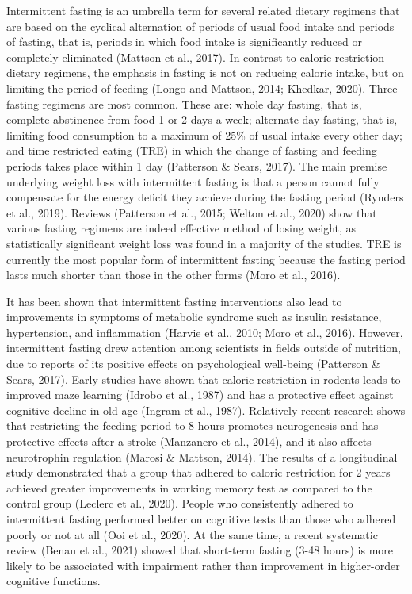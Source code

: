 \documentclass[authordate, empirical]{jote-new-article}
\begin{document}
Intermittent fasting is an umbrella term for several related dietary regimens that are based on the cyclical alternation of periods of usual food intake and periods of fasting, that is, periods in which food intake is significantly reduced or completely eliminated (Mattson et al., 2017). In contrast to caloric restriction dietary regimens, the emphasis in fasting is not on reducing caloric intake, but on limiting the period of feeding (Longo and Mattson, 2014; Khedkar, 2020). Three fasting regimens are most common. These are: whole day fasting, that is, complete abstinence from food 1 or 2 days a week; alternate day fasting, that is, limiting food consumption to a maximum of 25\% of usual intake every other day; and time restricted eating (TRE) in which the change of fasting and feeding periods takes place within 1 day (Patterson \& Sears, 2017). The main premise underlying weight loss with intermittent fasting is that a person cannot fully compensate for the energy deficit they achieve during the fasting period (Rynders et al., 2019). Reviews (Patterson et al., 2015; Welton et al., 2020) show that various fasting regimens are indeed effective method of losing weight, as statistically significant weight loss was found in a majority of the studies. TRE is currently the most popular form of intermittent fasting because the fasting period lasts much shorter than those in the other forms (Moro et al., 2016).



It has been shown that intermittent fasting interventions also lead to improvements in symptoms of metabolic syndrome such as insulin resistance, hypertension, and inflammation (Harvie et al., 2010; Moro et al., 2016). However, intermittent fasting drew attention among scientists in fields outside of nutrition, due to reports of its positive effects on psychological well-being (Patterson \& Sears, 2017). Early studies have shown that caloric restriction in rodents leads to improved maze learning (Idrobo et al., 1987) and has a protective effect against cognitive decline in old age (Ingram et al., 1987). Relatively recent research shows that restricting the feeding period to 8 hours promotes neurogenesis and has protective effects after a stroke (Manzanero et al., 2014), and it also affects neurotrophin regulation (Marosi \& Mattson, 2014). The results of a longitudinal study demonstrated that a group that adhered to caloric restriction for 2 years achieved greater improvements in working memory test as compared to the control group (Leclerc et al., 2020). People who consistently adhered to intermittent fasting performed better on cognitive tests than those who adhered poorly or not at all (Ooi et al., 2020). At the same time, a recent systematic review (Benau et al., 2021) showed that short-term fasting (3-48 hours) is more likely to be associated with impairment rather than improvement in higher-order cognitive functions.
\end{document}
